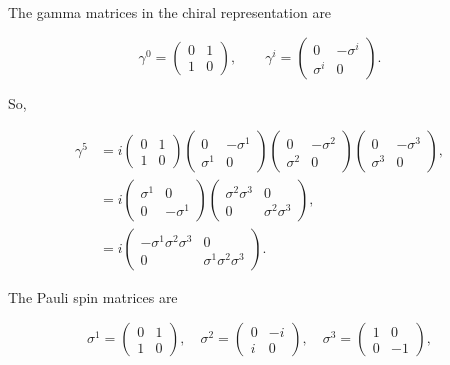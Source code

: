 \section{}

The gamma matrices in the chiral representation are 

\begin{equation}
    \gamma^0 = \begin{pmatrix}0 & 1 \\ 1 & 0\end{pmatrix}, \qquad \gamma^i = \begin{pmatrix}0 & -\sigma^i \\ \sigma^i & 0\end{pmatrix}.
\end{equation}

So,

\begin{align*}
    \gamma^5 &= i\begin{pmatrix}0 & 1 \\ 1 & 0\end{pmatrix}\begin{pmatrix}0 & -\sigma^1 \\ \sigma^1 & 0\end{pmatrix}\begin{pmatrix}0 & -\sigma^2 \\ \sigma^2 & 0\end{pmatrix}\begin{pmatrix}0 & -\sigma^3 \\ \sigma^3 & 0\end{pmatrix}, \\
    &= i \begin{pmatrix}\sigma^1 & 0 \\ 0 & -\sigma^1\end{pmatrix}\begin{pmatrix}\sigma^2\sigma^3 & 0 \\ 0 & \sigma^2\sigma^3\end{pmatrix}, \\
    &= i \begin{pmatrix}-\sigma^1\sigma^2\sigma^3 & 0 \\ 0 & \sigma^1\sigma^2\sigma^3\end{pmatrix}.
\end{align*}

The Pauli spin matrices are 

\begin{equation}
    \sigma^1 = \begin{pmatrix}0 & 1 \\ 1 & 0\end{pmatrix}, \quad \sigma^2 = \begin{pmatrix}0 & -i \\ i & 0\end{pmatrix}, \quad \sigma^3 = \begin{pmatrix}1 & 0 \\ 0 & -1\end{pmatrix},
\end{equation}

